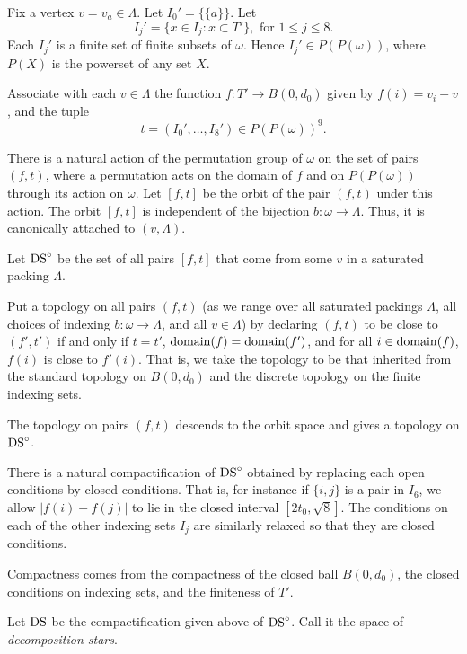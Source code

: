 Fix a vertex $v=v_a\in\Lambda$. Let $I_0'=\{\{a\}\}$. Let
   $$I_j' = \{x\in I_j : x \subset T'\},\text{ for } 1\le j\le 8.$$
Each $I_j'$ is a finite set of finite subsets of $\omega$. Hence
$I_j'\in P(P(\omega))$, where $P(X)$ is the powerset of any set
$X$.

Associate with each $v\in\Lambda$ the function $f:T'\to B(0,d_0)$
given by $f(i) = v_i - v$, and the tuple
    $$t = (I_0',\ldots,I_8')\in P(P(\omega))^9.$$


There is a natural action of the permutation group of $\omega$ on
the set of pairs $(f,t)$, where a permutation acts on the domain
of $f$ and on $P(P(\omega))$ through its action on $\omega$. Let
$[f,t]$ be the orbit of the pair $(f,t)$ under this action.  The
orbit $[f,t]$ is independent of the bijection
$b:\omega\to\Lambda$.  Thus, it is canonically attached to
$(v,\Lambda)$.

\begin{definition}\label{def:d-star0}
Let ${\operatorname{DS}}^\circ$ be the set of all pairs $[f,t]$ that come
from some $v$ in a saturated packing $\Lambda$.
\end{definition}

Put a topology on all pairs $(f,t)$ (as we range over all saturated
packings $\Lambda$, all choices of indexing $b:\omega\to\Lambda$,
and all $v\in\Lambda$) by declaring $(f,t)$ to be close to $(f',t')$
if and only if $t=t'$, ${\operatorname{domain}}(f)={\operatorname{domain}}(f')$, and for all
$i\in {\operatorname{domain}}(f)$, $f(i)$ is close to $f'(i)$. That is, we take
the topology to be that inherited from the standard topology on
$B(0,d_0)$ and the discrete topology on the finite indexing sets.

The topology on pairs $(f,t)$ descends to the orbit space and
gives a topology on ${\operatorname{DS}}^\circ$.

There is a natural compactification of ${\operatorname{DS}}^\circ$ obtained by
replacing each open conditions by closed conditions.  That is, for
instance if $\{i,j\}$ is a pair in $I_6$, we allow $|f(i)-f(j)|$
to lie in the closed interval $[2t_0,\sqrt8]$. The conditions on
each of the other indexing sets $I_j$ are similarly relaxed so
that they are closed conditions.

Compactness comes from the compactness of the closed ball
$B(0,d_0)$, the closed conditions on indexing sets, and the
finiteness of $T'$.

\begin{definition} \label{def:decomposition-star}
Let ${\operatorname{DS}}$ be the compactification given above of
${\operatorname{DS}}^\circ$.  Call it the space of {\it decomposition stars}.
%
\end{definition}


